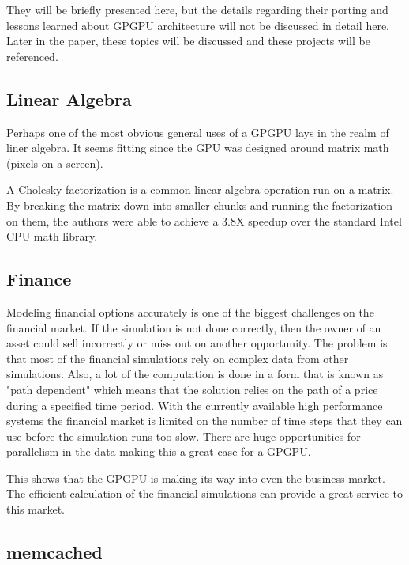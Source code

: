 They will be briefly presented here, but the details regarding their porting and lessons learned about GPGPU architecture will not be discussed in detail here. Later in the paper, these topics will be discussed and these projects will be referenced. 

\subsection*{Linear Algebra}

Perhaps one of the most obvious general uses of a GPGPU lays in the realm of liner algebra. It seems fitting since the GPU was designed around matrix math (pixels on a screen). 

A Cholesky factorization is a common linear algebra operation run on a matrix. By breaking the matrix down into smaller chunks and running the factorization on them, the authors were able to achieve a 3.8X speedup over the standard Intel CPU math library. \cite{linearalg}

\subsection*{Finance}

Modeling financial options accurately is one of the biggest challenges on the financial market. If the simulation is not done correctly, then the owner of an asset could sell incorrectly or miss out on another opportunity. The problem is that most of the financial simulations rely on complex data from other simulations. Also, a lot of the computation is done in a form that is known as "path dependent" which means that the solution relies on the path of a price during a specified time period. With the currently available high performance systems the financial market is limited on the number of time steps that they can use before the simulation runs too slow. There are huge opportunities for parallelism in the data making this a great case for a GPGPU. 

This shows that the GPGPU is making its way into even the business market. The efficient calculation of the financial simulations can provide a great service to this market. \cite{finance}

\subsection*{memcached}


